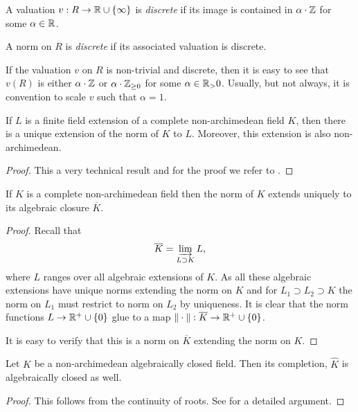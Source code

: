 \begin{definition}
	A valuation $v: R \to \mathbb{R} \cup \{\infty\} $ is \emph{discrete} if its image is contained in $\alpha \cdot \mathbb{Z}$ for some $\alpha \in \mathbb{R}$. 

	A norm on  $R$ is \emph{discrete} if its associated valuation is discrete.
\end{definition}
If the valuation $v$ on $R$ is non-trivial and discrete, then it is easy to see that $v(R)$ is either $\alpha \cdot \mathbb{Z}$ or $\alpha \cdot \mathbb{Z}_{\ge 0}$ for some $\alpha \in \mathbb{R}_> 0$. 
Usually, but not always, it is convention to scale $v$ such that $\alpha = 1$. 



\begin{theorem}\label{thm:norm_finite_field_ext}
	If $L$ is a finite field extension of a complete non-archimedean field $K$, then there is a unique extension of the norm of $K$ to $L$. Moreover, this extension is also non-archimedean.
\end{theorem}
\begin{proof}
	This a very technical result and for the proof we refer to \cite[][appendix A]{boschLecturesFormalRigid2014}. 
\end{proof}
\begin{corollary}
	If $K$ is a complete non-archimedean field then the norm of  $K$ extends uniquely to its algebraic closure $\overline{K}$.
\end{corollary}
\begin{proof}
	Recall that \[
	\overline{K} = \varinjlim_{L \supset K} L
	,\] 
	where $L$ ranges over all algebraic extensions of $K$. 
	As all these algebraic extensions have unique norms extending  the norm on $K$ and for $L_1 \supset L_2 \supset K$ the norm on  $L_1$ must restrict to norm on $L_2$ by uniqueness. 
	It is clear that the norm functions $L \to \mathbb{R}^{+} \cup \{0\} $ glue to a map $\|\cdot \|: \overline{K} \to \mathbb{R}^{+} \cup \{0\} $. 

	It is easy to verify that this is a norm on $\overline{K}$ extending the norm on $K$. 
\end{proof}

\begin{theorem}
	Let $K$ be a non-archimedean algebraically closed field. 
	Then its completion, $\widehat K$ is algebraically closed as well. 
\end{theorem}
\begin{proof}
	This follows from the continuity of roots. See \cite[][lem A.6]{boschLecturesFormalRigid2014} for a detailed argument. 
\end{proof}

